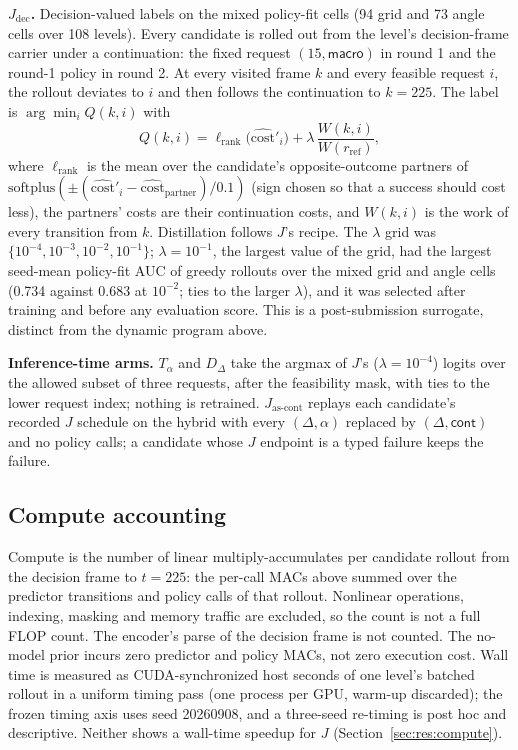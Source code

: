 \begin{revblock}
\textbf{$J_{\mathrm{dec}}$.} Decision-valued labels on the mixed policy-fit cells (94 grid and 73 angle cells over 108 levels). Every candidate is rolled out from the level's decision-frame carrier under a continuation: the fixed request $(15,\textsf{macro})$ in round 1 and the round-1 policy in round 2. At every visited frame $k$ and every feasible request $i$, the rollout deviates to $i$ and then follows the continuation to $k=225$. The label is $\arg\min_i Q(k,i)$ with
\begin{equation*}
Q(k,i)=\ell_{\mathrm{rank}}\big(\widehat{\mathrm{cost}}'_i\big)+\lambda\,\frac{W(k,i)}{W(r_{\mathrm{ref}})},
\end{equation*}
where $\ell_{\mathrm{rank}}$ is the mean over the candidate's opposite-outcome partners of $\mathrm{softplus}(\pm(\widehat{\mathrm{cost}}'_i-\widehat{\mathrm{cost}}_{\mathrm{partner}})/0.1)$ (sign chosen so that a success should cost less), the partners' costs are their continuation costs, and $W(k,i)$ is the work of every transition from $k$. Distillation follows $J$'s recipe. The $\lambda$ grid was $\{10^{-4},10^{-3},10^{-2},10^{-1}\}$; $\lambda=10^{-1}$, the largest value of the grid, had the largest seed-mean policy-fit AUC of greedy rollouts over the mixed grid and angle cells (0.734 against 0.683 at $10^{-2}$; ties to the larger $\lambda$), and it was selected after training and before any evaluation score. This is a post-submission surrogate, distinct from the dynamic program above.

\textbf{Inference-time arms.} $T_\alpha$ and $D_\Delta$ take the argmax of $J$'s ($\lambda=10^{-4}$) logits over the allowed subset of three requests, after the feasibility mask, with ties to the lower request index; nothing is retrained. $J_{\text{as-cont}}$ replays each candidate's recorded $J$ schedule on the hybrid with every $(\Delta,\alpha)$ replaced by $(\Delta,\textsf{cont})$ and no policy calls; a candidate whose $J$ endpoint is a typed failure keeps the failure.

\subsection{Compute accounting}

Compute is the number of linear multiply-accumulates per candidate rollout from the decision frame to $t=225$: the per-call MACs above summed over the predictor transitions and policy calls of that rollout. Nonlinear operations, indexing, masking and memory traffic are excluded, so the count is not a full FLOP count. The encoder's parse of the decision frame is not counted. The no-model prior incurs zero predictor and policy MACs, not zero execution cost. Wall time is measured as CUDA-synchronized host seconds of one level's batched rollout in a uniform timing pass (one process per GPU, warm-up discarded); the frozen timing axis uses seed 20260908, and a three-seed re-timing is post hoc and descriptive. Neither shows a wall-time speedup for $J$ (Section~\ref{sec:res:compute}).


\end{revblock}
